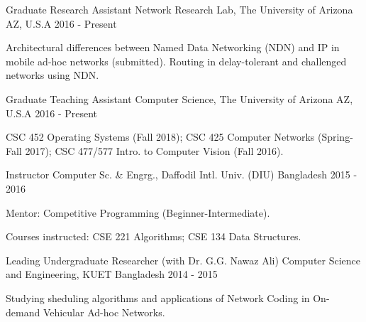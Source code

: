 

\begin{cventries}

  \cventry
    {Graduate Research Assistant} %
    {Network Research Lab, The University of Arizona} %
    {AZ, U.S.A} %
    {2016 - Present} %
    {
      \begin{cvitems} %
        \item {Architectural differences between Named Data Networking (NDN) and IP in mobile ad-hoc networks (submitted). Routing in delay-tolerant and challenged networks using NDN.}
      \end{cvitems}
    }
    {}

  \cventry
    {Graduate Teaching Assistant} %
    {Computer Science, The University of Arizona} %
    {AZ, U.S.A} %
    {2016 - Present} %
    {
      \begin{cvitems} %
        \item {CSC 452 Operating Systems (Fall 2018); CSC 425 Computer Networks (Spring-Fall 2017); CSC 477/577 Intro. to Computer Vision (Fall 2016).}
      \end{cvitems}
    }
    {}

  \cventry
    {Instructor} %
    {Computer Sc. \& Engrg., Daffodil Intl. Univ. (DIU)} %
    {Bangladesh} %
    {2015 - 2016} %
    {
      \begin{cvitems} %
        \item {Mentor: Competitive Programming (Beginner-Intermediate).}
        \item {Courses instructed: CSE 221 Algorithms; CSE 134 Data Structures.}
      \end{cvitems}
    }
    {}

  \cventry
    {Leading Undergraduate Researcher (with Dr. G.G. Nawaz Ali)} %
    {Computer Science and Engineering, KUET} %
    {Bangladesh} %
    {2014 - 2015} %
    {
      \begin{cvitems} %
        \item {Studying sheduling algorithms and applications of Network Coding in On-demand Vehicular Ad-hoc Networks.}
      \end{cvitems}
    }
    {}


\end{cventries}
